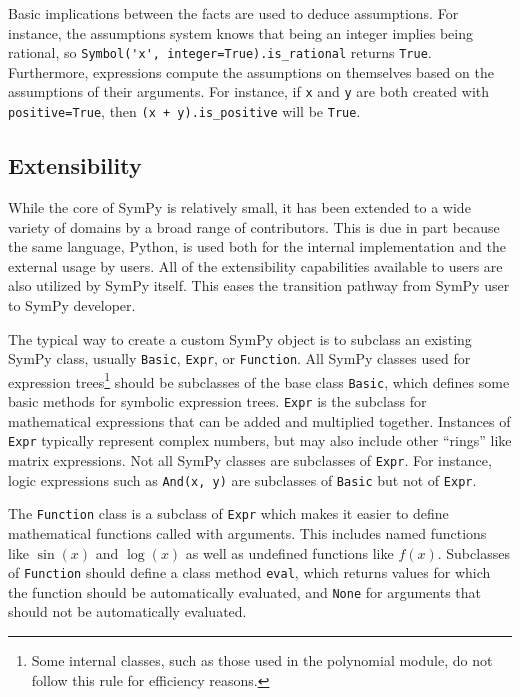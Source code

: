 Basic implications between the facts are used to deduce assumptions. For
instance, the assumptions system knows that being an integer implies being
rational, so \verb|Symbol('x', integer=True).is_rational| returns
\texttt{True}. Furthermore, expressions compute the assumptions on themselves
based on the assumptions of their arguments. For instance, if \texttt{x} and
\texttt{y} are both created with \texttt{positive=True}, then
\verb|(x + y).is_positive| will be \texttt{True}.


\subsection{Extensibility}

While the core of SymPy is relatively small, it has been extended to a wide variety
of domains by a broad range of contributors.  This is due in part because the
same language, Python, is used both for the internal implementation and the
external usage by users.  All of the extensibility capabilities available to
users are also utilized by SymPy itself. This eases the transition pathway from
SymPy user to SymPy developer.

The typical way to create a custom SymPy object is to subclass an existing
SymPy class, usually  \texttt{Basic}, \texttt{Expr}, or
\texttt{Function}. All SymPy classes used for expression trees\footnote{Some
  internal classes, such as those used in the polynomial module, do not follow
  this rule for efficiency reasons.} should be subclasses of the base class
\texttt{Basic}, which defines some basic methods for symbolic expression
trees. \texttt{Expr} is the subclass for mathematical expressions that can be
added and multiplied together. Instances of \texttt{Expr} typically represent
complex numbers, but may also include other ``rings'' like matrix expressions.
Not all SymPy classes are subclasses of \texttt{Expr}. For instance, logic expressions such
as \verb|And(x, y)| are subclasses of \texttt{Basic} but not of \texttt{Expr}.

The \texttt{Function} class is a subclass of \texttt{Expr} which makes it
easier to define mathematical functions called with arguments. This includes
named functions like $\sin(x)$ and $\log(x)$ as well as undefined functions
like $f(x)$. Subclasses of \texttt{Function} should define a
class method \texttt{eval}, which returns values for which the function should
be automatically evaluated, and \texttt{None} for arguments that should not be
automatically evaluated.

